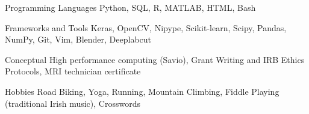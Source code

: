 

\begin{cvskills}

 \cvskill
  	{Programming Languages}
    {Python, SQL, R, MATLAB, HTML, Bash} %
  
 \cvskill
   {Frameworks and Tools}
   {Keras, OpenCV, Nipype, Scikit-learn, Scipy, Pandas, NumPy, Git, Vim, Blender, Deeplabcut}
   
 \cvskill
   {Conceptual}
   {High performance computing (Savio), Grant Writing and IRB Ethics Protocols, MRI technician certificate}
   
 \cvskill
   {Hobbies}
   {Road Biking, Yoga, Running, Mountain Climbing, Fiddle Playing (traditional Irish music), Crosswords}
    

\end{cvskills}

